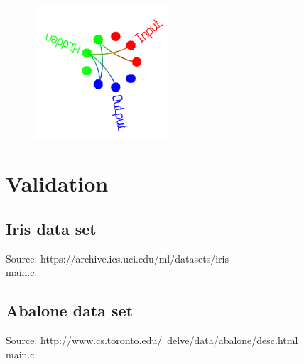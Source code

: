 \begin{center}
\begin{figure}[H]
\centering\includegraphics[width=5cm]{./cloud.png}\\
\end{figure}
\end{center}



\section{Validation}

\subsection{Iris data set}

Source: https://archive.ics.uci.edu/ml/datasets/iris \\

main.c:\\
\begin{scriptsize}
\begin{ttfamily}

\end{ttfamily}
\end{scriptsize}

\subsection{Abalone data set}

Source: http://www.cs.toronto.edu/~delve/data/abalone/desc.html \\

main.c:\\
\begin{scriptsize}
\begin{ttfamily}

\end{ttfamily}
\end{scriptsize}

